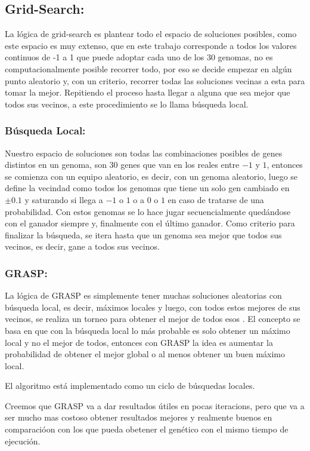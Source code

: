 \subsection{Grid-Search:}

La lógica de grid-search es plantear todo el espacio de soluciones posibles,
como este espacio es muy extenso, que en este trabajo corresponde a todos los
valores continuos de -1 a 1 que puede adoptar cada uno de los 30 genomas, no es
computacionalmente posible recorrer todo, por eso se decide empezar en algún
punto aleatorio y, con un criterio, recorrer todas las soluciones vecinas a esta
para tomar la mejor. Repitiendo el proceso hasta llegar a alguna que sea mejor que
todos sus vecinos, a este procedimiento se lo llama búsqueda local.


\subsubsection{Búsqueda Local:}


Nuestro espacio de soluciones son todas las combinaciones posibles de genes
distintos en un genoma, son 30 genes que van en los reales entre $-1$ y $1$,
entonces se comienza con un equipo aleatorio, es decir, con un genoma aleatorio,
luego se define la vecindad como todos los genomas que tiene un solo gen
cambiado en $\pm 0.1$ y saturando si llega a $-1$ o $1$ o a $0$ o $1$ en caso de
tratarse de una probabilidad. Con estos genomas se lo hace jugar secuencialmente
quedándose con el ganador siempre y, finalmente con el último ganador. Como
criterio para finalizar la búsqueda, se itera hasta que un genoma sea
mejor que todos sus vecinos, es decir, gane a todos sus vecinos.


\subsubsection{GRASP:}


La lógica de GRASP es simplemente tener muchas soluciones aleatorias con
búsqueda local, es decir, máximos locales y luego, con todos estos mejores de
sus vecinos, se realiza un torneo para obtener el mejor de todos esos . El
concepto se basa en que con la búsqueda local lo más probable es solo obtener un
máximo local y no el mejor de todos, entonces con GRASP la idea es aumentar la
probabilidad de obtener el mejor global o al menos obtener un buen máximo local.

El algoritmo está implementado como un ciclo de búsquedas locales.

Creemos que GRASP va a dar resultados útiles en pocas iteracions, pero que va a
ser mucho mas costoso obtener resultados mejores y realmente buenos en
comparacióon con los que pueda obetener el genético con el mismo tiempo de
ejecución.
